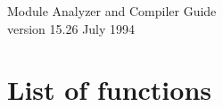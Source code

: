 
\Begin

{Module Analyzer and Compiler Guide \\
{\sf version 15.26}}
{July 1994}

\tableofcontents








\appendix


\chapter{List of functions}


\End
